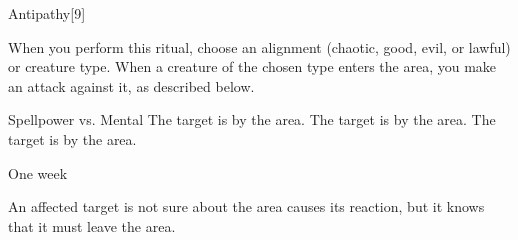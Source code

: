 \begin{spellsection}{Antipathy}[9]
    \begin{spellheader}
    \end{spellheader}
    \begin{spellcontent}
        \begin{spelltargetinginfo}
        \end{spelltargetinginfo}
        \begin{spelleffects}
            \spellspecial When you perform this ritual, choose an alignment (chaotic, good, evil, or lawful) or creature type.
            \spelleffect When a creature of the chosen type enters the area, you make an attack against it, as described below.
            \begin{spellattack}{Spellpower vs. Mental}
                \spellsuccess The target is \frightened by the area.
                \spellcritical The target is \panicked by the area.
                \spellfailure The target is \shaken by the area.
            \end{spellattack}
            \spelldur One week
        \end{spelleffects}
    \end{spellcontent}
    \begin{spellfooter}
        \spellnotes An affected target is not sure about the area causes its reaction, but it knows that it must leave the area.
    \end{spellfooter}
    \begin{spellaugments}
    \end{spellaugments}
\end{spellsection}

